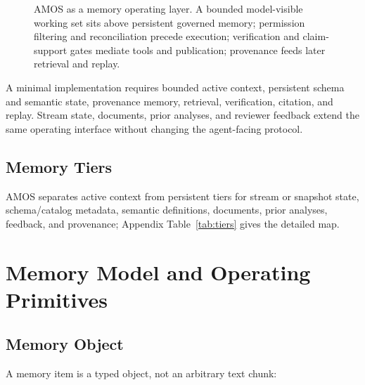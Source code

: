 \documentclass[10pt]{article}
\newcommand{\amos}{\textsc{AMOS}\xspace}
\begin{document}
\begin{figure}[H]
\caption{\amos as a memory operating layer. A bounded model-visible working set sits above persistent governed memory; permission filtering and reconciliation precede execution; verification and claim-support gates mediate tools and publication; provenance feeds later retrieval and replay.}
\label{fig:architecture}
\end{figure}

A minimal implementation requires bounded active context, persistent schema and semantic state, provenance memory, retrieval, verification, citation, and replay. Stream state, documents, prior analyses, and reviewer feedback extend the same operating interface without changing the agent-facing protocol.

\subsection{Memory Tiers}
\amos separates active context from persistent tiers for stream or snapshot state, schema/catalog metadata, semantic definitions, documents, prior analyses, feedback, and provenance; Appendix Table~\ref{tab:tiers} gives the detailed map.

\section{Memory Model and Operating Primitives}

\subsection{Memory Object}
A memory item is a typed object, not an arbitrary text chunk:
\end{document}
